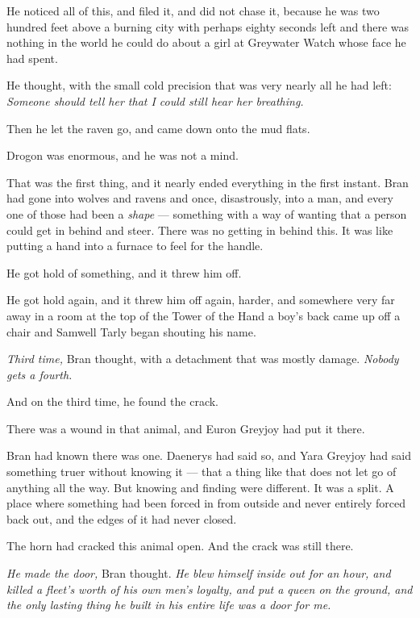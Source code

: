 He noticed all of this, and filed it, and did not chase it, because he was two hundred feet above a burning city with perhaps eighty seconds left and there was nothing in the world he could do about a girl at Greywater Watch whose face he had spent.

He thought, with the small cold precision that was very nearly all he had left: \textit{Someone should tell her that I could still hear her breathing.}

Then he let the raven go, and came down onto the mud flats.

\sceneBreak

Drogon was enormous, and he was not a mind.

That was the first thing, and it nearly ended everything in the first instant. Bran had gone into wolves and ravens and once, disastrously, into a man, and every one of those had been a \textit{shape} — something with a way of wanting that a person could get in behind and steer. There was no getting in behind this. It was like putting a hand into a furnace to feel for the handle.

He got hold of something, and it threw him off.

He got hold again, and it threw him off again, harder, and somewhere very far away in a room at the top of the Tower of the Hand a boy’s back came up off a chair and Samwell Tarly began shouting his name.

\textit{Third time,} Bran thought, with a detachment that was mostly damage. \textit{Nobody gets a fourth.}

And on the third time, he found the crack.

\sceneBreak

There was a wound in that animal, and Euron Greyjoy had put it there.

Bran had known there was one. Daenerys had said so, and Yara Greyjoy had said something truer without knowing it — that a thing like that does not let go of anything all the way. But knowing and finding were different. It was a split. A place where something had been forced in from outside and never entirely forced back out, and the edges of it had never closed.

The horn had cracked this animal open. And the crack was still there.

\textit{He made the door,} Bran thought. \textit{He blew himself inside out for an hour, and killed a fleet’s worth of his own men’s loyalty, and put a queen on the ground, and the only lasting thing he built in his entire life was a door for me.}

